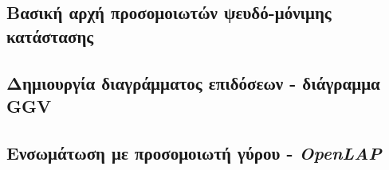 \subsection{Βασική αρχή προσομοιωτών ψευδό-μόνιμης κατάστασης}

\subsection{Δημιουργία διαγράμματος επιδόσεων - διάγραμμα GGV}

\subsection{Ενσωμάτωση με προσομοιωτή γύρου - \textit{OpenLAP}}
\label{subsec:openLAP}
